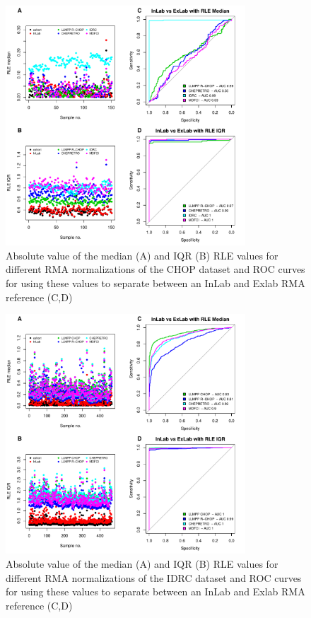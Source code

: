 \begin{figure}[!h]
	\begin{center}
		\includegraphics[width=0.8\textwidth]{figures/CHOP_rle.pdf}
	\end{center}
	\caption{Absolute value of the median (A) and IQR (B) RLE values for different RMA normalizations of the CHOP dataset and ROC curves for using these values to separate between an InLab and Exlab RMA reference (C,D)}
	\label{fig:chop_rle}
\end{figure}

\begin{figure}[!h]
	\begin{center}
		\includegraphics[width=0.8\textwidth]{figures/IDRC_rle.pdf}
	\end{center}
	\caption{Absolute value of the median (A) and IQR (B) RLE values for different RMA normalizations of the IDRC dataset and ROC curves for using these values to separate between an InLab and Exlab RMA reference (C,D)}
	\label{fig:idrc_rle}
\end{figure}

